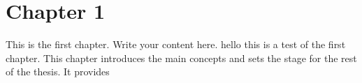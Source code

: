 \chapter{Chapter 1}
This is the first chapter. Write your content here.
hello this is a test of the first chapter.
This chapter introduces the main concepts and sets the stage for the rest of the thesis. It provides